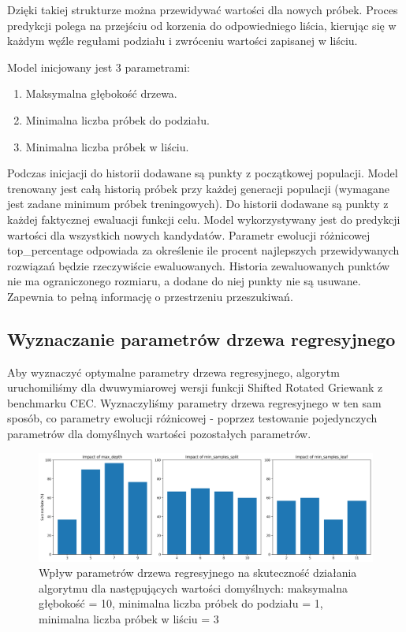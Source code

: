 \documentclass{article}
\begin{document}
Dzięki takiej strukturze można przewidywać wartości dla nowych próbek. Proces predykcji polega na przejściu od korzenia do odpowiedniego liścia, kierując się w każdym węźle regułami podziału i zwróceniu wartości zapisanej w liściu.

Model inicjowany jest 3 parametrami:
\begin{enumerate}
    \item Maksymalna głębokość drzewa.
    \item Minimalna liczba próbek do podziału.
    \item Minimalna liczba próbek w liściu.
\end{enumerate}

Podczas inicjacji do historii dodawane są punkty z początkowej populacji.
Model trenowany jest całą historią próbek przy każdej generacji populacji (wymagane jest zadane minimum próbek treningowych). Do historii dodawane są punkty z każdej faktycznej ewaluacji funkcji celu.
Model wykorzystywany jest do predykcji wartości dla wszystkich nowych kandydatów. Parametr ewolucji różnicowej top\_percentage odpowiada za określenie ile procent najlepszych przewidywanych rozwiązań będzie rzeczywiście ewaluowanych. Historia zewaluowanych punktów nie ma ograniczonego rozmiaru, a dodane do niej punkty nie są usuwane. Zapewnia to pełną informację o przestrzeniu przeszukiwań.

\subsection{Wyznaczanie parametrów drzewa regresyjnego}

Aby wyznaczyć optymalne parametry drzewa regresyjnego, algorytm uruchomiliśmy dla dwuwymiarowej wersji funkcji Shifted Rotated Griewank z benchmarku CEC. Wyznaczyliśmy parametry drzewa regresyjnego w ten sam sposób, co parametry ewolucji różnicowej - poprzez testowanie pojedynczych parametrów dla domyślnych wartości pozostałych parametrów.

\begin{figure}[H]
    \centering
    \includegraphics[width=\textwidth]{tree_parameter_tuning_separate_results2.png}
    \caption{Wpływ parametrów drzewa regresyjnego na skuteczność działania algorytmu dla następujących wartości domyślnych: maksymalna głębokość = 10, minimalna liczba próbek do podziału = 1, minimalna liczba próbek w liściu = 3}
    \label{fig:tree_parameter_results1}
\end{figure}
\end{document}
